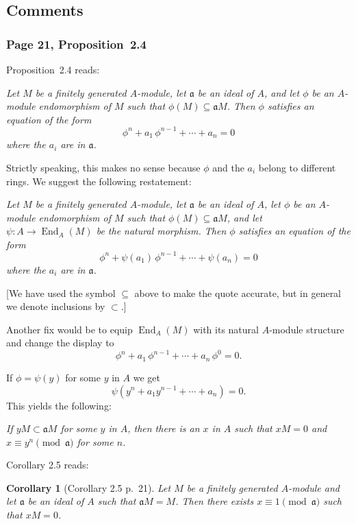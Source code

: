 \documentclass[12pt,letterpaper]{article}%
\newcommand{\oo}{\operatorname}\newcommand{\ooo}{\operatorname*}
\newcommand{\mf}{\mathfrak}
\newcommand{\aaa}{\mf a}
\newcommand{\nn}{\noindent}
\newtheorem{cor}[thm]{Corollary}
\begin{document}
\subsection{Comments}%

\subsubsection{Page 21, Proposition~2.4}\label{p2.4}%

Proposition~2.4 reads:

\nn\emph{Let $M$ be a finitely generated $A$-module, let $\aaa$ be an ideal of $A$, and let $\phi$ be an $A$-module endomorphism of $M$ such that $\phi(M)\subseteq\aaa M$. Then $\phi$ satisfies an equation of the form
$$
\phi^n+a_1\,\phi^{n-1}+\cdots+a_n=0
$$ 
where the $a_i$ are in $\aaa$.}

Strictly speaking, this makes no sense because $\phi$ and the $a_i$ belong to different rings. We suggest the following restatement:

\nn\emph{Let $M$ be a finitely generated $A$-module, let $\aaa$ be an ideal of $A$, let $\phi$ be an $A$-module endomorphism of $M$ such that $\phi(M)\subseteq\aaa M$, and let $\psi:A\to\oo{End}_A(M)$ be the natural morphism. Then $\phi$ satisfies an equation of the form
$$
\phi^n+\psi(a_1)\,\phi^{n-1}+\cdots+\psi(a_n)=0
$$ 
where the $a_i$ are in $\aaa$.}

[We have used the symbol $\subseteq$ above to make the quote accurate, but in general we denote inclusions by $\subset$.]

Another fix would be to equip $\operatorname{End}_A(M)$ with its natural $A$-module structure and change the display to 
$$
\phi^n+a_1\,\phi^{n-1}+\cdots+a_n\,\phi^0=0.
$$

If $\phi=\psi(y)$ for some $y$ in $A$ we get 
\begin{equation}\label{eq2124}
\psi(y^n+a_1y^{n-1}+\cdots+a_n)=0.
\end{equation}
This yields the following:

\nn\emph{If $yM\subset\aaa M$ for some $y$ in $A$, then there is an $x$ in $A$ such that $xM=0$ and $x\equiv y^n\pmod{\aaa}$ for some $n$.}

Corollary 2.5 reads:

\begin{cor}[Corollary 2.5 p.~21]\label{c2.5}
Let $M$ be a finitely generated $A$-module and let $\aaa$ be an ideal of $A$ such that $\aaa M=M$. Then there exists $x\equiv1\pmod{\aaa}$ such that $xM=0$.
\end{cor}
\end{document}
